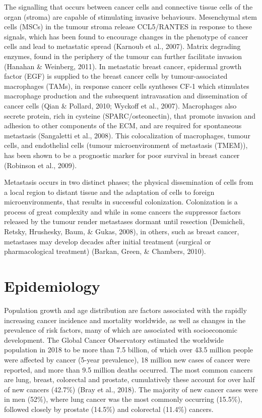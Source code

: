 \documentclass[a4paper, twoside]{templates/ociamthesis}
\begin{document}
The signalling that occurs between cancer cells and connective tissue cells of the organ (stroma) are capable of stimulating invasive behaviours. Mesenchymal stem cells (MSCs) in the tumour stroma release CCL5/RANTES in response to these signals, which has been found to encourage changes in the phenotype of cancer cells and lead to metastatic spread (Karnoub et al., 2007). Matrix degrading enzymes, found in the periphery of the tumour can further facilitate invasion (Hanahan \& Weinberg, 2011). In metastatic breast cancer, epidermal growth factor (EGF) is supplied to the breast cancer cells by tumour-associated macrophages (TAMs), in response cancer cells syntheses CF-1 which stimulates macrophage production and the subsequent intravasation and dissemination of cancer cells (Qian \& Pollard, 2010; Wyckoff et al., 2007). Macrophages also secrete protein, rich in cysteine (SPARC/osteonectin), that promote invasion and adhesion to other components of the ECM, and are required for spontaneous metastasis (Sangaletti et al., 2008). This colocalization of macrophages, tumour cells, and endothelial cells (tumour microenvironment of metastasis (TMEM)), has been shown to be a prognostic marker for poor survival in breast cancer (Robinson et al., 2009).

Metastasis occurs in two distinct phases; the physical dissemination of cells from a local region to distant tissue and the adaptation of cells to foreign microenvironments, that results in successful colonization. Colonization is a process of great complexity and while in some cancers the suppressor factors released by the tumour render metastases dormant until resection (Demicheli, Retsky, Hrushesky, Baum, \& Gukas, 2008), in others, such as breast cancer, metastases may develop decades after initial treatment (surgical or pharmacological treatment) (Barkan, Green, \& Chambers, 2010).

\hypertarget{epidemiology}{%
\section{Epidemiology}\label{epidemiology}}

Population growth and age distribution are factors associated with the rapidly increasing cancer incidence and mortality worldwide, as well as changes in the prevalence of risk factors, many of which are associated with socioeconomic development. The Global Cancer Observatory estimated the worldwide population in 2018 to be more than 7.5 billion, of which over 43.5 million people were affected by cancer (5-year prevalence), 18 million new cases of cancer were reported, and more than 9.5 million deaths occurred. The most common cancers are lung, breast, colorectal and prostate, cumulatively these account for over half of new cancers (42.7\%) (Bray et al., 2018). The majority of new cancer cases were in men (52\%), where lung cancer was the most commonly occurring (15.5\%), followed closely by prostate (14.5\%) and colorectal (11.4\%) cancers.
\end{document}
